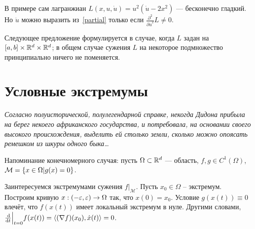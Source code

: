 \documentclass[a4paper]{article}
\begin{document}
    В примере сам лагранжиан $L(x, u, \dot{u}) = u^2(\dot{u} - 2x^2)$ --- бесконечно гладкий.
    Но $\ddot{u}$ можно выразить из~\eqref{partial} только если $\frac{\partial^2}{\partial \dot{u}^2}L \ne 0$.

    Следующее предложение формулируется в случае, когда $L$ задан на $[a, b] \times \mathbb{R}^d \times \mathbb{R}^d$; в общем случае сужения $L$ на некоторое подмножество принципиально ничего не поменяется.
    \section{Условные экстремумы}
    \emph{Согласно полуисторической, полулегендарной справке, некогда Дидона прибыла на берег некоего африканского государства, и потребовала, на основании своего высокого происхождения, выделить ей столько земли, сколько можно опоясать ремешком из шкуры одного быка\ldots}

    Напоминание конечномерного случая:
    пусть $\Omega \subset \mathbb{R}^d$ --- область, $f, g \in C^1(\Omega)$, $\mathcal{M} = \left\{x \in \Omega\middle|g(x) = 0\right\}$.

    Заинтересуемся экстремумами сужения $f\big|_{\mathcal{M}}$.
    Пусть $x_0 \in \Omega$ -- экстремум.
    Построим кривую ${x:(-\varepsilon,\varepsilon)\rightarrow \Omega}$ так, что $x(0) = x_0$.
    Условие $g(x(t)) \equiv 0$ влечёт, что $f(x(t))$ имеет локальный экстремум в нуле.
    Другими словами, $\frac{\operatorname{d}\!}{\operatorname{d}\! t}\Big|_{t = 0}f(x(t)) = \left\langle(\nabla f)(x_0), \dot{x}(t)\right\rangle = 0$.
\end{document}
